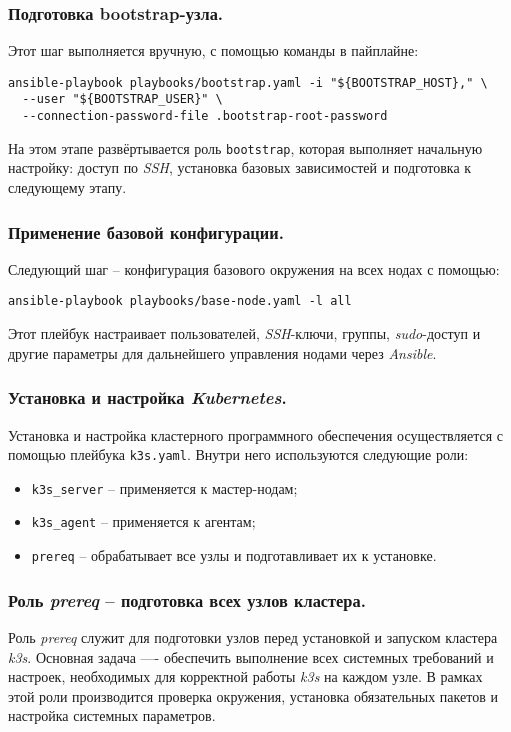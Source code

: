 \subsubsection{Подготовка bootstrap-узла.} Этот шаг выполняется вручную, с помощью команды в пайплайне:

\begin{lstlisting}
ansible-playbook playbooks/bootstrap.yaml -i "${BOOTSTRAP_HOST}," \
  --user "${BOOTSTRAP_USER}" \
  --connection-password-file .bootstrap-root-password
\end{lstlisting}

На этом этапе развёртывается роль \lstinline{bootstrap}, которая выполняет начальную настройку: доступ по \textit{SSH}, установка базовых зависимостей и подготовка к следующему этапу.

\subsubsection{Применение базовой конфигурации.} Следующий шаг -- конфигурация базового окружения на всех нодах с помощью:

\begin{lstlisting}
ansible-playbook playbooks/base-node.yaml -l all
\end{lstlisting}

Этот плейбук настраивает пользователей, \textit{SSH}-ключи, группы, \textit{sudo}-доступ и другие параметры для дальнейшего управления нодами через \textit{Ansible}.

\subsubsection{Установка и настройка \textit{Kubernetes}.} Установка и настройка кластерного программного обеспечения\cite{k3s} осуществляется с помощью плейбука \lstinline{k3s.yaml}. Внутри него используются следующие роли:

\begin{itemize}
  \item \lstinline{k3s_server} -- применяется к мастер-нодам;
  \item \lstinline{k3s_agent} -- применяется к агентам;
  \item \lstinline{prereq} -- обрабатывает все узлы и подготавливает их к установке.
\end{itemize}

\subsubsection{Роль \textit{prereq} -- подготовка всех узлов кластера.}
Роль \textit{prereq} служит для подготовки узлов перед установкой и запуском кластера \textit{k3s}. Основная задача —- обеспечить выполнение всех системных требований и настроек, необходимых для корректной работы \textit{k3s} на каждом узле. В рамках этой роли производится проверка окружения, установка обязательных пакетов и настройка системных параметров.

